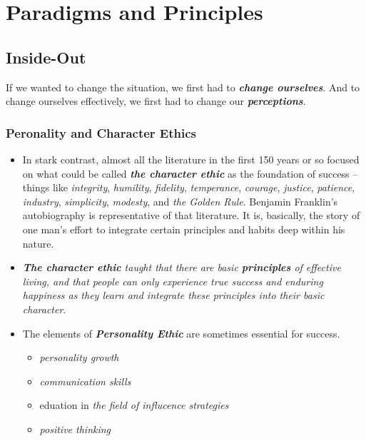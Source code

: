 \documentclass[11pt]{article}
\begin{document}
\newpage
\section{Paradigms and Principles}
\subsection{Inside-Out}
If we wanted to change the situation, we first had to \emph{\textbf{change ourselves}}. And to change ourselves effectively, we first had to change our \emph{\textbf{perceptions}}.
\subsubsection{Peronality and Character Ethics}
\begin{itemize}
\item In stark contrast, almost all the literature in the first 150 years or so focused on what could be called \emph{\textbf{the character ethic}} as the foundation of success -- things like \emph{integrity}, \emph{humility}, \emph{fidelity}, \emph{temperance}, \emph{courage}, \emph{justice}, \emph{patience}, \emph{industry}, \emph{simplicity}, \emph{modesty}, and \emph{the Golden Rule}. Benjamin Franklin's autobiography is representative of that literature. It is, basically, the story of one man's effort to integrate certain principles and habits deep within his nature.

\item \emph{\textbf{The character ethic} taught that there are basic \textbf{principles} of effective living, and that people can only experience true success and enduring happiness as they learn and integrate these principles into their basic character}.

\item The elements of \emph{\textbf{Personality Ethic}} are sometimes essential for success.
\begin{itemize}
\item \emph{personality growth}
\item \emph{communication skills}
\item eduation in \emph{the field of influcence strategies}
\item \emph{positive thinking}
\end{itemize} 
\end{itemize}
\end{document}
